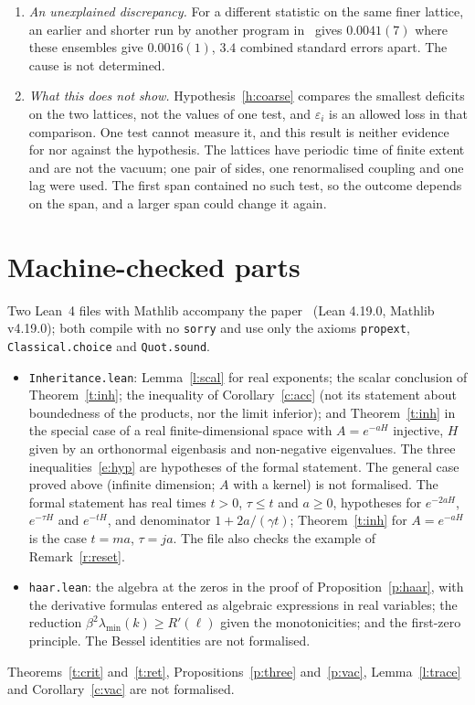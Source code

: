 \begin{enumerate}
estimates do not support $\mathsf R_{10}\ge\alpha\,\mathsf R_5$ with $\alpha>0.951$. The figure is two jackknife
standard errors over few streams, not a confidence limit at a stated level, and it inherits the coupling
match.
\item \emph{An unexplained discrepancy.} For a different statistic on the same finer lattice, an earlier and
shorter run by another program in~\cite{RepoData} gives $0.0041(7)$ where these ensembles give $0.0016(1)$,
$3.4$ combined standard errors apart. The cause is not determined.
\item \emph{What this does not show.} Hypothesis~\ref{h:coarse} compares the smallest deficits on the two
lattices, not the values of one test, and $\varepsilon_i$ is an allowed loss in that comparison. One test cannot measure
it, and this result is neither evidence for nor against the hypothesis. The lattices have periodic time of
finite extent and are not the vacuum; one pair of sides, one renormalised coupling and one lag were used. The
first span contained no such test, so the outcome depends on the span, and a larger span could change it
again.
\end{enumerate}

\section{Machine-checked parts}\label{s:lean}
Two Lean~4 files with Mathlib accompany the paper~\cite{RepoLean} (Lean 4.19.0, Mathlib v4.19.0); both compile with no \texttt{sorry} and use
only the axioms \texttt{propext}, \texttt{Classical.choice} and \texttt{Quot.sound}.
\begin{itemize}
\item \texttt{Inheritance.lean}: Lemma~\ref{l:scal} for real exponents; the scalar conclusion of
Theorem~\ref{t:inh}; the inequality of Corollary~\ref{c:acc} (not its statement about boundedness of the
products, nor the limit inferior); and Theorem~\ref{t:inh} in the special case of a real finite-dimensional
space with $A=e^{-aH}$ injective, $H$ given by an orthonormal eigenbasis and non-negative eigenvalues. The
three inequalities~\eqref{e:hyp} are hypotheses of the formal statement. The general case proved above
(infinite dimension; $A$ with a kernel) is not formalised. The formal statement has real times $t>0$,
$\tau\le t$ and $a\ge0$, hypotheses for $e^{-2aH}$, $e^{-\tau H}$ and $e^{-tH}$, and denominator
$1+2a/(\gamma t)$; Theorem~\ref{t:inh} for $A=e^{-aH}$ is the case $t=ma$, $\tau=ja$. The file also checks the
example of Remark~\ref{r:reset}.
\item \texttt{haar.lean}: the algebra at the zeros in the proof of Proposition~\ref{p:haar}, with the
derivative formulas entered as algebraic expressions in real variables; the reduction
$\beta^2\lambda_{\min}(k)\ge R'(\ell)$ given the monotonicities; and the first-zero principle. The Bessel identities are not
formalised.
\end{itemize}
Theorems~\ref{t:crit} and~\ref{t:ret}, Propositions~\ref{p:three} and~\ref{p:vac}, Lemma~\ref{l:trace} and
Corollary~\ref{c:vac} are not formalised.

